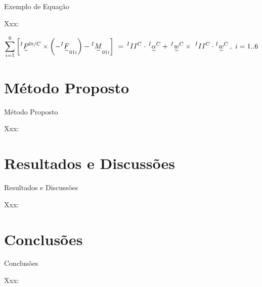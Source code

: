\documentclass[compress]{beamer}
\begin{document}
\begin{frame}{Exemplo de Equa\c c\~ao}

Xxx:

\begin{block}

%
{\scriptsize $$\sum\limits_{i = 1}^6 {\left[ {{}^I{{\underset{\raise0.2em\hbox{$\smash{\scriptscriptstyle\thicksim}$}}{P} }^{0i/C}}\times\left( { - {}^I{{\underset{\raise0.2em\hbox{$\smash{\scriptscriptstyle\thicksim}$}}{F} }_{01i}}} \right) - {}^I{{\underset{\raise0.2em\hbox{$\smash{\scriptscriptstyle\thicksim}$}}{M} }_{01i}}} \right]} \,\, = \,{}^II{I^C} \cdot \,{}^I{\underset{\raise0.2em\hbox{$\smash{\scriptscriptstyle\thicksim}$}}{\alpha} ^C} + \,{ {{}^I{{\underset{\raise0.2em\hbox{$\smash{\scriptscriptstyle\thicksim}$}}{w} }^C}} }\times\,\,{}^II{I^C} \cdot {}^I{\underset{\raise0.2em\hbox{$\smash{\scriptscriptstyle\thicksim}$}}{w} ^C}\,,\,\,i=1..6 $$}

\end{block}

\end{frame}


\section{M\'etodo Proposto}

\begin{frame}{M\'etodo Proposto}

Xxx:

\end{frame}


\section{Resultados e Discuss\~oes}

\begin{frame}{Resultados e Discuss\~oes}

Xxx:

\end{frame}


\section{Conclus\~oes}

\begin{frame}{Conclus\~oes}

Xxx:

\end{frame}

\end{document}
